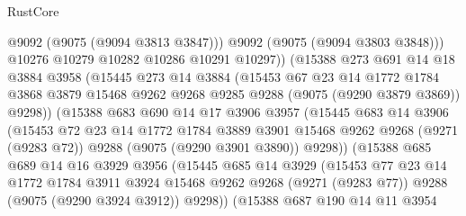 \begin{lexlean}{RustCore}
\begin{coremodule}
                      @9092
                      (@9075 (@9094 @3813 @3847)))
                    @9092
                    (@9075 (@9094 @3803 @3848)))
                  @10276
                  @10279
                  @10282
                  @10286
                  @10291
                  @10297))
              (@15388
                @273
                @691
                @14
                @18
                @3884
                @3958
                (@15445
                  @273
                  @14
                  @3884
                  (@15453
                    @67
                    @23
                    @14
                    @1772
                    @1784
                    @3868
                    @3879
                    @15468
                    @9262
                    @9268
                    @9285
                    @9288
                    (@9075 (@9290 @3879 @3869))
                    @9298))
                (@15388
                  @683
                  @690
                  @14
                  @17
                  @3906
                  @3957
                  (@15445
                    @683
                    @14
                    @3906
                    (@15453
                      @72
                      @23
                      @14
                      @1772
                      @1784
                      @3889
                      @3901
                      @15468
                      @9262
                      @9268
                      (@9271 (@9283 @72))
                      @9288
                      (@9075 (@9290 @3901 @3890))
                      @9298))
                  (@15388
                    @685
                    @689
                    @14
                    @16
                    @3929
                    @3956
                    (@15445
                      @685
                      @14
                      @3929
                      (@15453
                        @77
                        @23
                        @14
                        @1772
                        @1784
                        @3911
                        @3924
                        @15468
                        @9262
                        @9268
                        (@9271 (@9283 @77))
                        @9288
                        (@9075 (@9290 @3924 @3912))
                        @9298))
                    (@15388
                      @687
                      @190
                      @14
                      @11
                      @3954

\end{coremodule}
\end{lexlean}
